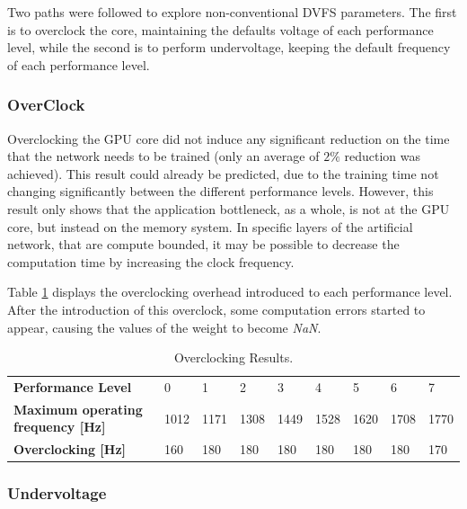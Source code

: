 Two paths were followed to explore non-conventional DVFS parameters. The first is to overclock the core, maintaining the defaults voltage of each performance level, while the second is to perform undervoltage, keeping the default frequency of each performance level.

\subsubsection{OverClock}
\label{section:OverClock}
Overclocking the GPU core did not induce any significant reduction on the time that the network needs to be trained (only an average of $2\%$ reduction was achieved). This result could already be predicted, due to the training time not changing significantly between the different performance levels. However, this result only shows that the application bottleneck, as a whole, is not at the GPU core, but instead on the memory system. In specific layers of the artificial network, that are compute bounded, it may be possible to decrease the computation time by increasing the clock frequency.

Table \ref{tab:overclocking-res} displays the overclocking overhead introduced to each performance level. After the introduction of this overclock, some computation errors started to appear, causing the values of the weight to become \textit{NaN}.

\begin{table}[!htb]
\centering
\begin{tabular}{l|llllllll}
\textbf{Performance Level}  & 0   & 1   & 2   & 3   & 4   & 5   & 6   & 7    \\
\textbf{Maximum operating frequency [Hz]}    & 1012  & 1171 & 1308 & 1449 & 1528 & 1620 & 1708 & 1770 \\
\textbf{Overclocking  {[}Hz{]}} &  160  & 180 & 180 & 180 & 180 & 180 & 180 &  170
\end{tabular}
\caption{Overclocking  Results.}
\label{tab:overclocking-res}
\end{table}

\subsubsection{Undervoltage}
\label{section:undervoltage}

